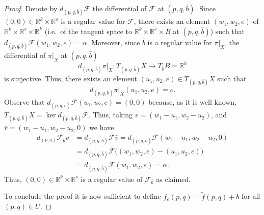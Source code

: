 \documentclass[a4paper]{amsart}
\numberwithin{equation}{section}
\newcommand{\R}{\mathbb{R}}
\newcommand{\F}{\mathcal{F}}
\newcommand{\e}{\varepsilon}
\begin{document}
\begin{proof}
Denote by $d_{(p,q,\bar b)}\F$ the differential  of $\F$ at $(p,q,\bar b)$. Since 
$(0,0)\in\R^k\times\R^s$ is a regular value for $\F$, there exists an element $(w_1,w_2,e)$ 
of $\R^k\times\R^s\times\R^k$ (i.e.\ of the tangent space to $\R^k\times\R^s\times B$ at 
$(p,q,\bar b)$) such that $d_{(p,q,\bar b)}\F(w_1,w_2,e)=\alpha$. Moreover, since $\bar b$ is 
a regular value for $\pi|_X$, the differential of $\pi|_X$ at $(p,q,\bar b)$ 
\[
d_{(p,q,\bar b)}\pi|_X:T_{(p,q,\bar b)}X\to T_{\bar b}B =\R^k
\]
is surjective. Thus, there exists an element $(u_1,u_2,e)\in T_{(p,q,\bar b)}X$ such that
\[
d_{(p,q,\bar b)}\pi|_X(u_1,u_2,e)=e.
\] 
Observe that $d_{(p,q,\bar b)}\F(u_1,u_2,e)=(0,0)$ 
because, as it is well known, $T_{(p,q,\bar b)}X=\ker d_{(p,q,\bar b)}\F$. Thus, taking $v=(w_1-u_1,w_2-u_2)$, and $\bar v=(w_1-u_1,w_2-u_2,0)$
we have
\begin{align*}
d_{(p,q)}\F_{\bar b} v &= d_{(p,q,\bar b)}\F\bar v
                    = d_{(p,q,\bar b)}\F (w_1-u_1,w_2-u_2,0)\\
                    &= d_{(p,q,\bar b)}\F\big( (w_1,w_2,e)-(u_1,u_2,e)\big)\\
                    &= d_{(p,q,\bar b)}\F(w_1,w_2,e)=\alpha.
\end{align*}
Thus, $(0,0)\in\R^k\times\R^s$ is a regular value of $\F_{\bar b}$ as claimed. 

To conclude the proof it is now sufficient to define $f_\e(p,q)=\tilde f(p,q)+\bar b$ for all 
$(p,q)\in U$.
\end{proof}
\end{document}
